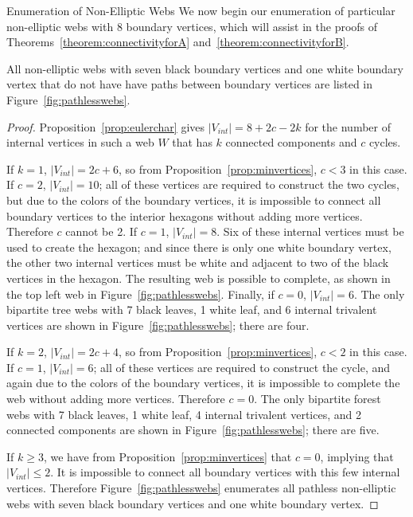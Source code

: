 \begin{subsection}{Enumeration of Non-Elliptic Webs}
We now begin our enumeration of particular non-elliptic webs with 8 boundary vertices, which will assist in the proofs of Theorems~\ref{theorem:connectivityforA} and~\ref{theorem:connectivityforB}.

\begin{lemma}\label{lemma:pathlesswebs}
All non-elliptic webs with seven black boundary vertices and one white boundary vertex that do not have have paths between boundary vertices are listed in Figure~\ref{fig:pathlesswebs}.
\end{lemma}

\begin{proof}
Proposition~\ref{prop:eulerchar} gives $|V_{int}|=8+2c-2k$ for the number of internal vertices in such a web $W$ that has $k$ connected components and $c$ cycles.

If $k=1$, $|V_{int}|=2c+6$, so from Proposition~\ref{prop:minvertices}, $c<3$ in this case. If $c=2$, $|V_{int}|=10$; all of these vertices are required to construct the two cycles, but due to the colors of the boundary vertices, it is impossible to connect all boundary vertices to the interior hexagons without adding more vertices. Therefore $c$ cannot be 2. If $c=1$, $|V_{int}|=8$. Six of these internal vertices must be used to create the hexagon; and since there is only one white boundary vertex, the other two internal vertices must be white and adjacent to two of the black vertices in the hexagon. The resulting web is possible to complete, as shown in the top left web in Figure~\ref{fig:pathlesswebs}. Finally, if $c=0$, $|V_{int}|=6$. The only bipartite tree webs with 7 black leaves, 1 white leaf, and 6 internal trivalent vertices are shown in Figure~\ref{fig:pathlesswebs}; there are four.

If $k=2$, $|V_{int}|=2c+4$, so from Proposition~\ref{prop:minvertices}, $c<2$ in this case. If $c=1$, $|V_{int}|=6$; all of these vertices are required to construct the cycle, and again due to the colors of the boundary vertices, it is impossible to complete the web without adding more vertices. Therefore $c=0$. The only bipartite forest webs with 7 black leaves, 1 white leaf, 4 internal trivalent vertices, and 2 connected components are shown in Figure~\ref{fig:pathlesswebs}; there are five.

If $k\geq 3$, we have from Proposition~\ref{prop:minvertices} that $c=0$, implying that $|V_{int}|\leq 2$. It is impossible to connect all boundary vertices with this few internal vertices. Therefore Figure~\ref{fig:pathlesswebs} enumerates all pathless non-elliptic webs with seven black boundary vertices and one white boundary vertex.
\end{proof}


\end{subsection}
